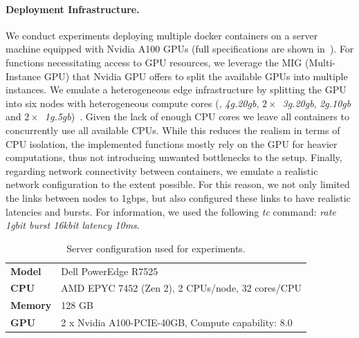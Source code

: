 \paragraph{Deployment Infrastructure.} We conduct experiments deploying multiple docker containers on a server machine equipped with Nvidia A100 GPUs (full specifications are shown in~). For functions necessitating access to GPU resources, we leverage the MIG (Multi-Instance GPU) that Nvidia GPU offers to split the available GPUs into multiple instances. We emulate a heterogeneous edge infrastructure by splitting the GPU into six nodes with heterogeneous compute cores (\ie, \textit{4g.20gb}, $2\times$~\textit{3g.20gb}, \textit{2g.10gb} and $2\times$~\textit{1g.5gb})~\cite{nvidiamig}. Given the lack of enough CPU cores we leave all containers to concurrently use all available CPUs. While this reduces the realism in terms of CPU isolation, the implemented functions mostly rely on the GPU for heavier computations, thus not introducing unwanted bottlenecks to the setup. Finally, regarding network connectivity between containers, we emulate a realistic network configuration to the extent possible. For this reason, we not only limited the links between nodes to 1gbps, but also configured these links to have realistic latencies and bursts. For information, we used the following \textit{tc} command: \textit{rate 1gbit burst 16kbit latency 10ms}.

\begin{table}
	\centering
	\begin{tabular}{p{1cm}p{7cm}}
    \toprule
	\textbf{Model}  & Dell PowerEdge R7525                           			\\
	\textbf{CPU}    & AMD EPYC 7452 (Zen 2), 2 CPUs/node, 32 cores/CPU  	\\
	\textbf{Memory} & 128 GB																							\\
	\textbf{GPU}    & 2 x Nvidia A100-PCIE-40GB, Compute capability: 8.0	\\
	\bottomrule
	\end{tabular}
	\caption{Server configuration used for experiments.}
	\label{tab:grid5000}
\end{table}

